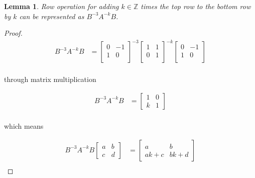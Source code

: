 \documentclass[11pt]{article}
\newcommand{\Z}{\mathbb{Z}}
\newtheorem{lemma}{Lemma}
\begin{document}
\begin{lemma}
	Row operation for adding $k \in \Z$ times the top row to the bottom row by $k$ can be represented as $B^{-3}A^{-k}B$.
\end{lemma}

\begin{proof}
	\begin{align*}
		B^{-3}A^{-k}B & = \begin{bmatrix}
			                  0 & -1 \\
			                  1 & 0  \\
		                  \end{bmatrix}^{-3}  \begin{bmatrix}
			                                      1 & 1 \\
			                                      0 & 1 \\
		                                      \end{bmatrix}^{-k}\begin{bmatrix}
			                                                        0 & -1 \\
			                                                        1 & 0  \\
		                                                        \end{bmatrix} \\
	\end{align*}

	through matrix multiplication

	\begin{align*}
		B^{-3}A^{-k}B & = \begin{bmatrix}
			                  1 & 0 \\
			                  k & 1
		                  \end{bmatrix} \\
	\end{align*}

	which means

	\begin{align*}
		B^{-3}A^{-k}B\begin{bmatrix}
			             a & b \\
			             c & d
		             \end{bmatrix} & = \begin{bmatrix}
			                               a    & b    \\
			                               ak+c & bk+d
		                               \end{bmatrix} \\
	\end{align*}
\end{proof}
\end{document}
